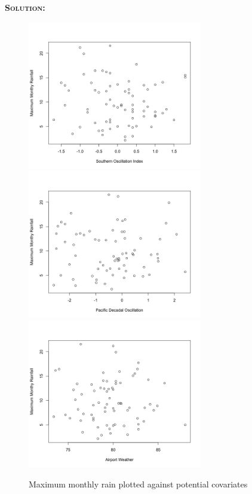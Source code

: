 \documentclass[12pt,oneside]{article}
\newenvironment{solution}
    {\textbf{\textsc{Solution:}}\\}
    {\newpage}
\begin{document}
\begin{solution}
\begin{figure}[H]
\begin{center}
{\includegraphics[width=3in]{Assignments/a3/rain-vs-soi.png}}
{\includegraphics[width=3in]{Assignments/a3/rain-vs-pdo.png}}
{\includegraphics[width=3in]{Assignments/a3/rain-vs-temp.png}}
\caption{Maximum monthly rain plotted against potential covariates }
\end{center}
\end{figure}

\end{solution}
\end{document}
